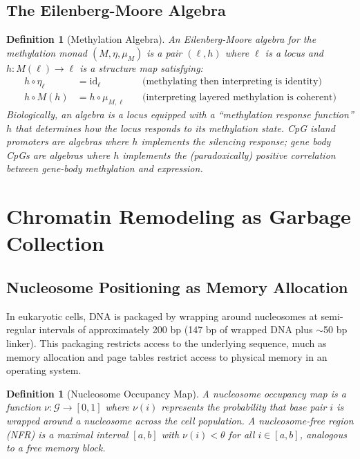 \documentclass[12pt,a4paper]{article}
\newtheorem{definition}[theorem]{Definition}
\newcommand{\id}{\mathrm{id}}
\begin{document}
\subsection{The Eilenberg-Moore Algebra}

\begin{definition}[Methylation Algebra]
\label{def:em-algebra}
An \emph{Eilenberg-Moore algebra} for the methylation monad $(M, \eta, \mu_M)$ is a pair $(\ell, h)$ where $\ell$ is a locus and $h : M(\ell) \to \ell$ is a structure map satisfying:
\begin{align}
    h \circ \eta_\ell &= \id_\ell \quad &\text{(methylating then interpreting is identity)} \\
    h \circ M(h) &= h \circ \mu_{M,\ell} \quad &\text{(interpreting layered methylation is coherent)}
\end{align}
Biologically, an algebra is a locus equipped with a ``methylation response function'' $h$ that determines how the locus responds to its methylation state. CpG island promoters are algebras where $h$ implements the silencing response; gene body CpGs are algebras where $h$ implements the (paradoxically) positive correlation between gene-body methylation and expression.
\end{definition}

\section{Chromatin Remodeling as Garbage Collection}
\label{sec:gc}

\subsection{Nucleosome Positioning as Memory Allocation}

In eukaryotic cells, DNA is packaged by wrapping around nucleosomes at semi-regular intervals of approximately 200 bp (147 bp of wrapped DNA plus $\sim$50 bp linker). This packaging restricts access to the underlying sequence, much as memory allocation and page tables restrict access to physical memory in an operating system.

\begin{definition}[Nucleosome Occupancy Map]
\label{def:nuc-map}
A \emph{nucleosome occupancy map} is a function $\nu : \mathcal{G} \to [0,1]$ where $\nu(i)$ represents the probability that base pair $i$ is wrapped around a nucleosome across the cell population. A \emph{nucleosome-free region} (NFR) is a maximal interval $[a,b]$ with $\nu(i) < \theta$ for all $i \in [a,b]$, analogous to a free memory block.
\end{definition}
\end{document}
